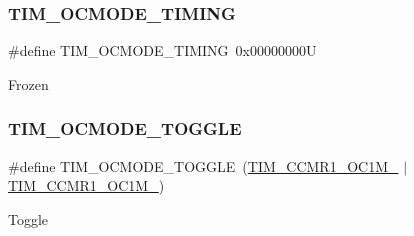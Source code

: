 \subsubsection{\texorpdfstring{TIM\_OCMODE\_TIMING}{TIM\_OCMODE\_TIMING}}
{\footnotesize\ttfamily \#define T\+I\+M\+\_\+\+O\+C\+M\+O\+D\+E\+\_\+\+T\+I\+M\+I\+NG~0x00000000U}

Frozen \mbox{\label{group___t_i_m___output___compare__and___p_w_m__modes_ga368f80fad76018e2bf76084522e47536}} 
\subsubsection{\texorpdfstring{TIM\_OCMODE\_TOGGLE}{TIM\_OCMODE\_TOGGLE}}
{\footnotesize\ttfamily \#define T\+I\+M\+\_\+\+O\+C\+M\+O\+D\+E\+\_\+\+T\+O\+G\+G\+LE~(\mbox{\hyperlink{group___peripheral___registers___bits___definition_ga8b5f6ec25063483641d6dc065d96d2b5}{T\+I\+M\+\_\+\+C\+C\+M\+R1\+\_\+\+O\+C1\+M\+\_}} $\vert$ \mbox{\hyperlink{group___peripheral___registers___bits___definition_ga410a4752a98081bad8ab3f72b28e7c5f}{T\+I\+M\+\_\+\+C\+C\+M\+R1\+\_\+\+O\+C1\+M\+\_}})}

Toggle 